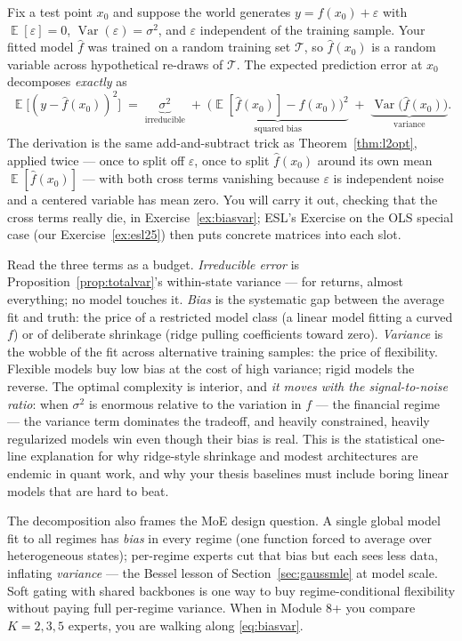 \documentclass[11pt]{article}
\numberwithin{equation}{section}
\theoremstyle{plain}
\theoremstyle{definition}
\theoremstyle{remark}
\DeclareMathOperator{\E}{\mathbb{E}}
\DeclareMathOperator{\Var}{Var}
\begin{document}
Fix a test point $x_0$ and suppose the world generates $y = f(x_0) + \varepsilon$ with $\E[\varepsilon] = 0$, $\Var(\varepsilon) = \sigma^2$, and $\varepsilon$ independent of the training sample. Your fitted model $\hat f$ was trained on a random training set $\mathcal{T}$, so $\hat f(x_0)$ is a random variable across hypothetical re-draws of $\mathcal{T}$. The expected prediction error at $x_0$ decomposes \emph{exactly} as
\begin{equation}
\E\big[(y - \hat f(x_0))^2\big]
\;=\;
\underbrace{\sigma^2}_{\text{irreducible}}
\;+\;
\underbrace{\big(\E[\hat f(x_0)] - f(x_0)\big)^2}_{\text{squared bias}}
\;+\;
\underbrace{\Var\big(\hat f(x_0)\big)}_{\text{variance}} .
\label{eq:biasvar}
\end{equation}
The derivation is the same add-and-subtract trick as Theorem~\ref{thm:l2opt}, applied twice --- once to split off $\varepsilon$, once to split $\hat f(x_0)$ around its own mean $\E[\hat f(x_0)]$ --- with both cross terms vanishing because $\varepsilon$ is independent noise and a centered variable has mean zero. You will carry it out, checking that the cross terms really die, in Exercise~\ref{ex:biasvar}; ESL's Exercise on the OLS special case (our Exercise~\ref{ex:esl25}) then puts concrete matrices into each slot.

Read the three terms as a budget. \emph{Irreducible error} is Proposition~\ref{prop:totalvar}'s within-state variance --- for returns, almost everything; no model touches it. \emph{Bias} is the systematic gap between the average fit and truth: the price of a restricted model class (a linear model fitting a curved $f$) or of deliberate shrinkage (ridge pulling coefficients toward zero). \emph{Variance} is the wobble of the fit across alternative training samples: the price of flexibility. Flexible models buy low bias at the cost of high variance; rigid models the reverse. The optimal complexity is interior, and \emph{it moves with the signal-to-noise ratio}: when $\sigma^2$ is enormous relative to the variation in $f$ --- the financial regime --- the variance term dominates the tradeoff, and heavily constrained, heavily regularized models win even though their bias is real. This is the statistical one-line explanation for why ridge-style shrinkage and modest architectures are endemic in quant work, and why your thesis baselines must include boring linear models that are hard to beat.

\begin{necbox}
The decomposition also frames the MoE design question. A single global model fit to all regimes has \emph{bias} in every regime (one function forced to average over heterogeneous states); per-regime experts cut that bias but each sees less data, inflating \emph{variance} --- the Bessel lesson of Section~\ref{sec:gaussmle} at model scale. Soft gating with shared backbones is one way to buy regime-conditional flexibility without paying full per-regime variance. When in Module 8+ you compare $K = 2, 3, 5$ experts, you are walking along \eqref{eq:biasvar}.
\end{necbox}
\end{document}
